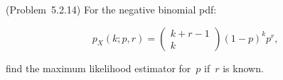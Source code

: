 \begin{problem}
  (\textnormal{Problem~5.2.14}) For the negative binomial pdf:

  \begin{equation}\label{eq:P07}
    p_{X}(k;p,r) =  \left(%
                      \begin{array}{c}
                        k + r - 1 \\
                        k
                      \end{array}
                    \right) (1-p)^{k} p^{r}\text{,}
  \end{equation}

  \noindent
  find the maximum likelihood estimator for~$p$ if~$r$ is known.
\end{problem}
